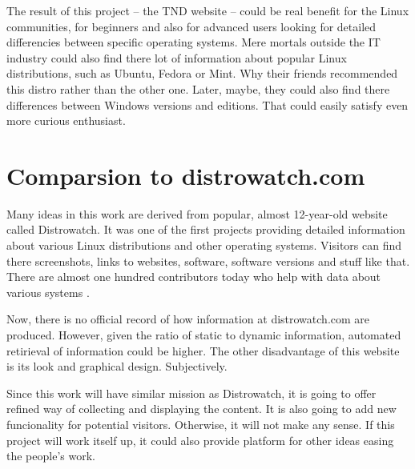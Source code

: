 \documentclass[thesis=B,english]{FITthesis}[2013/04/26]
\begin{document}
The result of this project -- the TND website -- could be real benefit for the Linux communities, for beginners and also for advanced users looking for detailed differencies between specific operating systems. Mere mortals outside the IT industry could also find there lot of information about popular Linux distributions, such as Ubuntu, Fedora or Mint. Why their friends recommended this distro rather than the other one. Later, maybe, they could also find there differences between Windows versions and editions. That could easily satisfy even more curious enthusiast.


\section{Comparsion to distrowatch.com}


Many ideas in this work are derived from popular, almost 12-year-old website called Distrowatch. It was one of the first projects providing detailed information about various Linux distributions and other operating systems. Visitors can find there screenshots, links to websites, software, software versions and stuff like that. There are almost one hundred contributors today who help with data about various systems \cite{dw_about}.

Now, there is no official record of how information at distrowatch.com are produced. However, given the ratio of static to dynamic information, automated retirieval of information could be higher. The other disadvantage of this website is its look and graphical design. Subjectively.

Since this work will have similar mission as Distrowatch, it is going to offer refined way of collecting and displaying the content. It is also going to add new funcionality for potential visitors. Otherwise, it will not make any sense. If this project will work itself up, it could also provide platform for other ideas easing the people's work.
\end{document}

